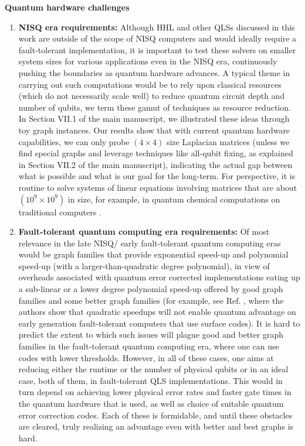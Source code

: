 \documentclass[%
 reprint,
 superscriptaddress,
 amsmath,amssymb,
 aps,
 pra,
floatfix,
nofootinbib,
]{revtex4-2}
\theoremstyle{definition}
\theoremstyle{remark}
\newcommand{\appsubsection}[1]{%
  \refstepcounter{subsection}%
  \bigskip
  \noindent\textbf{\thesubsection\quad #1}\par
  \smallskip
}
\begin{document}
\begin{appendix}
\appsubsection{Quantum hardware challenges} 

\begin{enumerate} 
\item \textbf{NISQ era requirements: } Although HHL and other QLSs discussed in this work are outside of the scope of NISQ computers and would ideally require a fault-tolerant implementation, it is important to test these solvers on smaller system sizes for various applications even in the NISQ era, continuously pushing the boundaries as quantum hardware advances. A typical theme in carrying out such computations would be to rely upon classical resources (which do not necessarily scale well) to reduce quantum circuit depth and number of qubits, we term these gamut of techniques as resource reduction. In Section VII.1 of the main manuscript, we illustrated these ideas through toy graph instances. Our results show that with current quantum hardware capabilities, we can only probe $(4 \times 4)$ size Laplacian matrices (unless we find special graphs and leverage techniques like all-qubit fixing, as explained in Section VII.2 of the main manuscript), indicating the actual gap between what is possible and what is our goal for the long-term. For perspective, it is routine to solve systems of linear equations involving matrices that are about $(10^9 \times 10^9)$ in size, for example, in quantum chemical computations on traditional computers \cite{Timo}. 

\item \textbf{Fault-tolerant quantum computing era requirements: }Of most relevance in the late NISQ/ early fault-tolerant quantum computing eras would be graph families that provide exponential speed-up and polynomial speed-up (with a larger-than-quadratic degree polynomial), in view of overheads associated with quantum error corrected implementations eating up a sub-linear or a lower degree polynomial speed-up offered by good graph families and some better graph families (for example, see Ref. \cite{prx2021}, where the authors show that quadratic speedups will not enable quantum advantage on early generation fault-tolerant computers that use surface codes). It is hard to predict the extent to which such issues will plague good and better graph families in the fault-tolerant quantum computing era, where one can use codes with lower thresholds. However, in all of these cases, one aims at reducing either the runtime or the number of physical qubits or in an ideal case, both of them, in fault-tolerant QLS implementations. This would in turn depend on achieving lower physical error rates and faster gate times in the quantum hardware that is used, as well as choice of suitable quantum error correction codes. Each of these is formidable, and until these obstacles are cleared, truly realizing an advantage even with better and best graphs is hard. 
\end{enumerate} 


\end{appendix}
\end{document}
